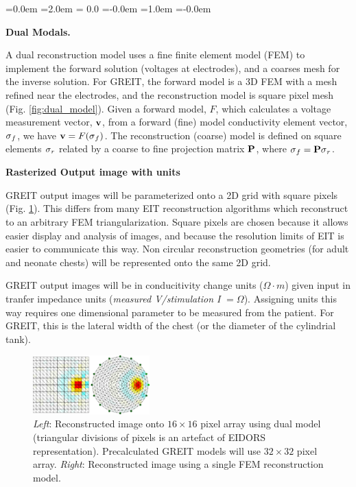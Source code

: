 \documentclass[letterpaper,twocolumn,11pt]{article}
\newcommand{\vB}{\mbox{$\bf v$}}
\newcommand{\PB}{\mbox{$\bf P$}}
\newcommand{\sG}{\mbox{$\bf \sigma$}}
\begin{document}
\begin{list}{\bf {}.}
  {\leftmargin=0.0em \itemindent=2.0em
    \topsep= 0.0\baselineskip
    \itemsep=-0.0em
    \listparindent=1.0em \parsep=-0.0em
    }

\item {\bf Dual Modals.}

A dual reconstruction model uses a fine finite element
model (FEM) to implement the forward solution (voltages
at electrodes), and a coarses mesh for the inverse
solution. For GREIT, the forward model is a 3D FEM with
a mesh refined near the electrodes, and the reconstruction
model is square pixel mesh (Fig. \ref{fig:dual_model}).
Given a forward model, $F$,
which calculates a voltage measurement vector, $\vB$, from
a forward (fine) model conductivity element vector, $\sG_f$, we
have $\vB = F( \sG_f )$. The reconstruction (coarse)
model is defined on square elements $\sG_r$ related by
a coarse to fine projection matrix $\PB$, where $\sG_f = \PB \sG_r$.

\item {\bf Rasterized Output image with units}

GREIT output images will be parameterized onto
a 2D grid with square pixels (Fig. \ref{fig:square_pixels}).
This differs from many EIT reconstruction algorithms
which reconstruct to an arbitrary FEM triangularization.
Square pixels are chosen because it allows easier
display and analysis of images, and because the 
resolution limits of EIT is easier to communicate this way.
Non circular reconstruction geometries (for adult and
neonate chests) will be represented onto the same 2D grid.

GREIT output images will be in conducitivity change units
($\Omega\cdot m$) given input in tranfer impedance units
({\em measured V/stimulation I} $=\Omega$). Assigning units
this way requires one dimensional parameter to be measured
from the patient. For GREIT, this is the lateral width of
the chest (or the diameter of the cylindrial tank).

\begin{figure}[tbh]
\begin{center}
 \includegraphics[width= 0.4\textwidth, bb=0 0 749 378]{figs/square_mesh06a.png}
\caption{ \label{fig:square_pixels}
\small
{\em Left}: Reconstructed image onto $16\times 16$ pixel array using
dual model (triangular divisions of pixels is an artefact of EIDORS
representation). Precalculated GREIT models
will use $32\times 32$ pixel array.
{\em Right}: Reconstructed image using a single FEM reconstruction model.
}
\end{center}
\end{figure}


\end{list}
\end{document}
